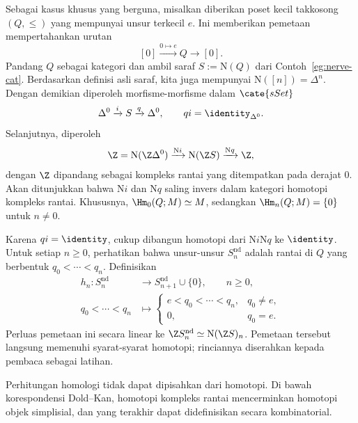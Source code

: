 \begin{example}\label{eg:homology-poset-e}
	Sebagai kasus khusus yang berguna, misalkan diberikan poset kecil takkosong
	$(Q,\leq)$ yang mempunyai unsur terkecil $e$. Ini memberikan pemetaan
	mempertahankan urutan
	\[
	[0]\xrightarrow{0\mapsto e}Q\longrightarrow[0].
	\]
	Pandang $Q$ sebagai kategori dan ambil saraf
	$S:=\mathrm{N}(Q)$ dari Contoh~\ref{eg:nerve-cat}. Berdasarkan definisi
	asli saraf, kita juga mempunyai $\mathrm{N}([n])=\Delta^n$. Dengan
	demikian diperoleh morfisme-morfisme dalam $\cate{sSet}$
	\[
	\Delta^0\xrightarrow{i}S\xrightarrow{q}\Delta^0,
	\qquad qi=\identity_{\Delta^0}.
	\]
	Selanjutnya, diperoleh
	\begin{gather*}
		\Z=\mathrm{N}(\Z\Delta^0)
		\xrightarrow{\mathrm{N}i}\mathrm{N}(\Z S)
		\xrightarrow{\mathrm{N}q}\Z,
	\end{gather*}
	dengan $\Z$ dipandang sebagai kompleks rantai yang ditempatkan pada derajat
	$0$. Akan ditunjukkan bahwa $\mathrm{N}i$ dan $\mathrm{N}q$ saling invers
	dalam kategori homotopi kompleks rantai. Khususnya,
	$\Hm_0(Q;M)\simeq M$, sedangkan
	$\Hm_n(Q;M)=\{0\}$ untuk $n\neq0$.

	Karena $qi=\identity$, cukup dibangun homotopi dari
	$\mathrm{N}i\mathrm{N}q$ ke $\identity$. Untuk setiap $n\geq0$, perhatikan
	bahwa unsur-unsur $S_n^{\mathrm{nd}}$ adalah rantai di $Q$ yang berbentuk
	$q_0<\cdots<q_n$. Definisikan
	\begin{align*}
		h_n:S_n^{\mathrm{nd}}&\longrightarrow
		S_{n+1}^{\mathrm{nd}}\cup\{0\},\qquad n\geq0,\\
		q_0<\cdots<q_n&\longmapsto
		\begin{cases}
			e<q_0<\cdots<q_n,&q_0\neq e,\\
			0,&q_0=e.
		\end{cases}
	\end{align*}
	Perluas pemetaan ini secara linear ke
	$\Z S_n^{\mathrm{nd}}\simeq\mathrm{N}(\Z S)_n$. Pemetaan tersebut langsung
	memenuhi syarat-syarat homotopi; rinciannya diserahkan
	kepada pembaca sebagai latihan.
\end{example}

Perhitungan homologi tidak dapat dipisahkan dari homotopi. Di bawah
korespondensi Dold--Kan, homotopi kompleks rantai mencerminkan homotopi objek
simplisial, dan yang terakhir dapat didefinisikan secara kombinatorial.

